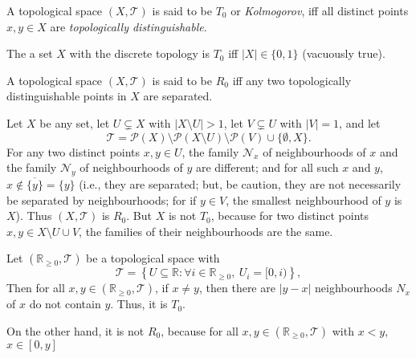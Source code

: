 \begin{definition}
	[$T_0$ spaces]
	\label{def: T_1 spaces}
	A topological space $(X, \mathcal T)$ is said to be $T_0$ or \textit{Kolmogorov}, iff all distinct points $x,y \in X$ are \textit{topologically distinguishable}.
\end{definition}


\begin{example}
	\label{eg: non-T_0 sets}
	The a set $X$ with the discrete topology is $T_0$ iff $|X| \in \{0,1\}$ (vacuously true).
\end{example}


\begin{definition}
	[$R_0$ spaces]
	\label{def: R_0 spaces}
	A topological space $(X, \mathcal T)$ is said to be $R_0$ iff any two topologically distinguishable points in $X$ are separated.
\end{definition}


\begin{example}
	\label{eg: R_0 but not T_0}
	Let $X$ be any set, let $U \subsetneq X$ with $|X \setminus U| > 1$, let $V \subsetneq U$ with $|V| = 1$, and let
	$$
	\mathcal T = \mathcal P(X) \setminus \mathcal P(X \setminus U) \setminus \mathcal P(V) \cup \{ \emptyset, X \}.
	$$
	For any two distinct points $x,y \in U$, the family $\mathcal N_x$ of neighbourhoods of $x$ and the family $\mathcal N_y$ of neighbourhoods of $y$ are different; and for all such $x$ and $y$, $x \notin \overline{ \{y\} } = \{ y \}$ (i.e., they are separated; but, be caution, they are not necessarily be separated by neighbourhoods; for if $y \in V$, the smallest neighbourhood of $y$ is $X$). Thus $(X, \mathcal T)$ is $R_0$. But $X$ is not $T_0$, because for two distinct points $x,y \in X \setminus U \cup V$, the families of their neighbourhoods are the same.
\end{example}


\begin{example}
	\label{eg: T_0 but not T_1}
	Let $(\mathbb R_{\ge 0}, \mathcal T)$ be a topological space with
	$$
	\mathcal T = \left\{ U \subseteq \mathbb R : \forall i \in \mathbb R_{\ge 0}, \ U_i = [0, i)  \right\},
	$$
	Then for all $x,y \in (\mathbb R_{\ge 0}, \mathcal T)$, if $x \ne y$, then there are $|y - x|$ neighbourhoods $N_x$ of $x$ do not contain $y$. Thus, it is $T_0$.
	
	On the other hand, it is not $R_0$, because for all $x, y \in (\mathbb R_{\ge 0}, \mathcal T)$ with $x < y$, $x \in [0,y]$
\end{example}


